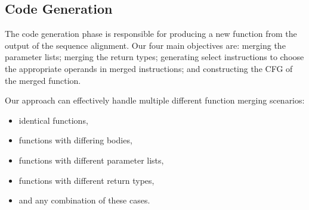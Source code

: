 


\subsection{Code Generation}
The code generation phase is responsible for producing a new function from the output of the sequence alignment.
Our four main objectives are: merging the parameter lists; merging the return types; generating select instructions to choose the appropriate
operands in merged instructions; and constructing the CFG of the merged function.

Our approach can effectively handle multiple different function merging scenarios:
\begin{itemize}[noitemsep,topsep=3pt]
  \item identical functions,
  \item functions with differing bodies,
  \item functions with different parameter lists, 
  \item functions with different return types,
  \item and any combination of these cases.
\end{itemize}

